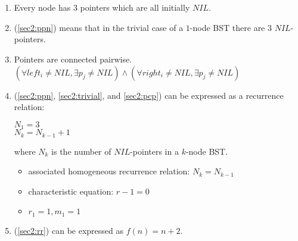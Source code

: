 \documentclass[12pt, a4paper]{article}
\begin{document}
\section{} %
\begin{enumerate}
	\item Every node has $3$ pointers which are all initially $NIL$.
	\label{sec2:ppn}

	\item (\ref{sec2:ppn}) means that in the trivial case of a $1$-node BST there are $3$ $NIL$-pointers.
	\label{sec2:trivial}

	\item Pointers are connected pairwise. $(\forall left_i \neq NIL, \exists p_j \neq NIL) \land (\forall right_i \neq NIL, \exists p_j \neq NIL)$
	\label{sec2:pcp}

	\item (\ref{sec2:ppn}, \ref{sec2:trivial}, and \ref{sec2:pcp}) can be expressed as a recurrence relation:

	$N_1 = 3$\\
	$N_k = N_{k - 1} + 1$

	where $N_k$ is the number of $NIL$-pointers in a $k$-node BST.

	\begin{itemize}
		\item associated homogeneous recurrence relation: $N_k = N_{k - 1}$
		\item characteristic equation: $r - 1 = 0$
		\item $r_1 = 1, m_1 = 1$
	\end{itemize}
	\label{sec2:rr}

	\item (\ref{sec2:rr}) can be expressed as $f(n) = n + 2$.
\end{enumerate}

\section{} %
\section{} %
\section{} %
\end{document}
